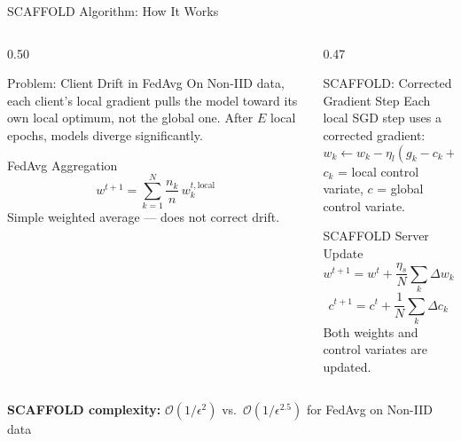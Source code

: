 \documentclass[aspectratio=169, 11pt]{beamer}
\begin{document}
\begin{frame}{SCAFFOLD Algorithm: How It Works}
  \begin{columns}[T]
    \begin{column}{0.50\textwidth}
      \begin{alertblock}{Problem: Client Drift in FedAvg}\small
        On Non-IID data, each client's local gradient pulls the model toward its own local optimum, not the global one. After $E$ local epochs, models diverge significantly.
      \end{alertblock}
      \vspace{4pt}
      \begin{block}{FedAvg Aggregation}\small
        \[
        w^{t+1} = \sum_{k=1}^{N} \frac{n_k}{n}\, w_k^{t, \text{local}}
        \]
        Simple weighted average --- does not correct drift.
      \end{block}
    \end{column}
    \begin{column}{0.47\textwidth}
      \begin{exampleblock}{SCAFFOLD: Corrected Gradient Step}\small
        Each local SGD step uses a corrected gradient:
        \[
        w_k \leftarrow w_k - \eta_l (g_k - c_k + c)
        \]
        $c_k$ = local control variate, $c$ = global control variate.
      \end{exampleblock}
      \vspace{4pt}
      \begin{exampleblock}{SCAFFOLD Server Update}\small
        \[
        w^{t+1} = w^t + \frac{\eta_s}{N}\sum_k \Delta w_k
        \]
        \[
        c^{t+1} = c^t + \frac{1}{N}\sum_k \Delta c_k
        \]
        Both weights and control variates are updated.
      \end{exampleblock}
    \end{column}
  \end{columns}
  \vspace{4pt}
  \begin{center}
    \small \textbf{SCAFFOLD complexity:} $\mathcal{O}(1/\epsilon^2)$ vs.\ $\mathcal{O}(1/\epsilon^{2.5})$ for FedAvg on Non-IID data
  \end{center}
\end{frame}
\end{document}
